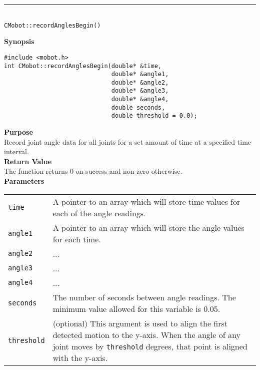 \noindent
\vspace{5pt}
\rule{4.5in}{0.015in}\\
\noindent
{\LARGE \texttt{CMobot::recordAnglesBegin()}}\\
{}

\noindent
{\bf Synopsis}
\vspace{-8pt}
\begin{verbatim}
#include <mobot.h>
int CMobot::recordAnglesBegin(double* &time, 
                              double* &angle1, 
                              double* &angle2, 
                              double* &angle3, 
                              double* &angle4, 
                              double seconds,
                              double threshold = 0.0);
\end{verbatim}

\noindent
{\bf Purpose}\\
Record joint angle data for all joints for a set amount of time at a specified time interval.\\

\noindent
{\bf Return Value}\\
The function returns 0 on success and non-zero otherwise.\\

\noindent
{\bf Parameters}\\
\vspace{-0.1in}
\begin{description}
\item               
\begin{tabular}{p{15 mm}p{145 mm}}
\texttt{time} & A pointer to an array which will store time values for each of the angle readings. \\
\texttt{angle1} & A pointer to an array which will store the angle values for each time. \\
\texttt{angle2} & ... \\
\texttt{angle3} & ... \\
\texttt{angle4} & ... \\
\texttt{seconds} & The number of seconds between angle readings. The minimum value allowed for
this variable is 0.05. \\
\texttt{threshold} & (optional) This argument is used to align the first
detected motion to the y-axis. When the angle of any joint moves by
\texttt{threshold} degrees, that point is aligned with the y-axis.
\end{tabular}
\end{description}

